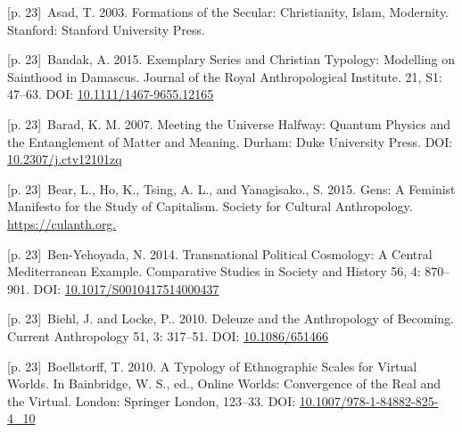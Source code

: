 \documentclass[10pt,a4paper]{article}
\begin{document}
\noindent\begin{minipage}[t]{\linewidth}{\scriptsize\color{gray} [p. 23]}\ Asad, T. 2003. Formations of the Secular: Christianity, Islam, Modernity. Stanford: Stanford University Press.\par\end{minipage}\par
\noindent\begin{minipage}[t]{\linewidth}{\scriptsize\color{gray} [p. 23]}\ Bandak, A. 2015. Exemplary Series and Christian Typology: Modelling on Sainthood in Damascus. Journal of the Royal Anthropological Institute. 21, S1: 47–63. DOI: \url{10.1111/1467-9655.12165}\par\end{minipage}\par
\noindent\begin{minipage}[t]{\linewidth}{\scriptsize\color{gray} [p. 23]}\ Barad, K. M. 2007. Meeting the Universe Halfway: Quantum Physics and the Entanglement of Matter and Meaning. Durham: Duke University Press. DOI: \url{10.2307/j.ctv12101zq}\par\end{minipage}\par
\noindent\begin{minipage}[t]{\linewidth}{\scriptsize\color{gray} [p. 23]}\ Bear, L., Ho, K., Tsing, A. L., and Yanagisako., S. 2015. Gens: A Feminist Manifesto for the Study of Capitalism. Society for Cultural Anthropology. \url{https://culanth.org.}\par\end{minipage}\par
\noindent\begin{minipage}[t]{\linewidth}{\scriptsize\color{gray} [p. 23]}\ Ben-Yehoyada, N. 2014. Transnational Political Cosmology: A Central Mediterranean Example. Comparative Studies in Society and History 56, 4: 870–901. DOI: \url{10.1017/S0010417514000437}\par\end{minipage}\par
\noindent\begin{minipage}[t]{\linewidth}{\scriptsize\color{gray} [p. 23]}\ Biehl, J. and Locke, P.. 2010. Deleuze and the Anthropology of Becoming. Current Anthropology 51, 3: 317–51. DOI: \url{10.1086/651466}\par\end{minipage}\par
\noindent\begin{minipage}[t]{\linewidth}{\scriptsize\color{gray} [p. 23]}\ Boellstorff, T. 2010. A Typology of Ethnographic Scales for Virtual Worlds. In Bainbridge, W. S., ed., Online Worlds: Convergence of the Real and the Virtual. London: Springer London, 123–33. DOI: \url{10.1007/978-1-84882-825-4_10}\par\end{minipage}\par
\end{document}
